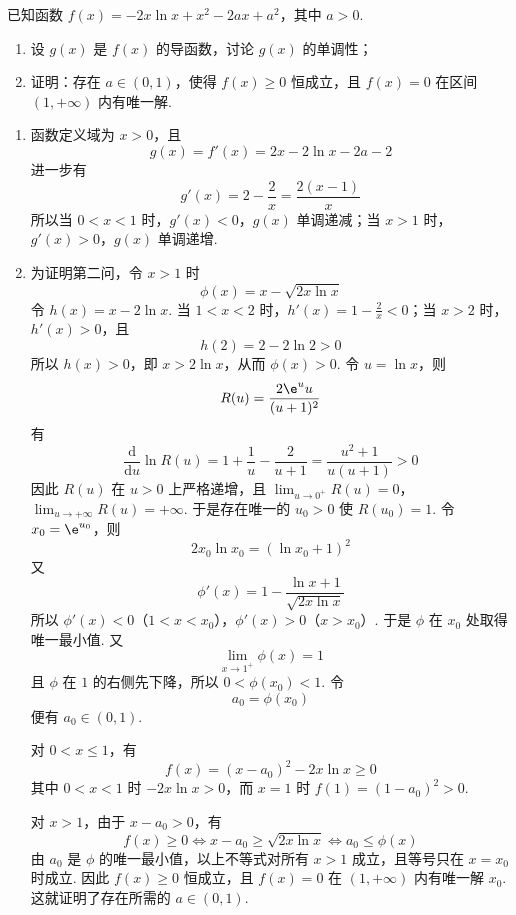 \begin{problem}
已知函数 \(f(x) = -2x\ln x + x^2 - 2ax + a^2\)，其中 \(a > 0\).

\begin{enumerate}
\item 设 \(g(x)\) 是 \(f(x)\) 的导函数，讨论 \(g(x)\) 的单调性；
\item 证明：存在 \(a \in (0,1)\)，使得 \(f(x) \geqslant 0\) 恒成立，且 \(f(x) = 0\) 在区间 \((1, +\infty)\) 内有唯一解.
\end{enumerate}
\end{problem}

\begin{solution}
\begin{enumerate}
\item
函数定义域为 \(x>0\)，且
\[
g(x)=f'(x)=2x-2\ln x-2a-2
\]
进一步有
\[
g'(x)=2-\frac2x=\frac{2(x-1)}x
\]
所以当 \(0<x<1\) 时，\(g'(x)<0\)，\(g(x)\) 单调递减；当 \(x>1\) 时，\(g'(x)>0\)，\(g(x)\) 单调递增.

\item
为证明第二问，令 \(x>1\) 时
\[
\phi(x)=x-\sqrt{2x\ln x}
\]
令 \(h(x)=x-2\ln x\). 当 \(1<x<2\) 时，\(h'(x)=1-\frac2x<0\)；当 \(x>2\) 时，\(h'(x)>0\)，且
\[
h(2)=2-2\ln2>0
\]
所以 \(h(x)>0\)，即 \(x>2\ln x\)，从而 \(\phi(x)>0\). 令 \(u=\ln x\)，则
\[
R(u)=\frac{2\e^u u}{(u+1)^2}
\]
有
\[
\frac{\mathrm d}{\mathrm du}\ln R(u)
=1+\frac1u-\frac2{u+1}
=\frac{u^2+1}{u(u+1)}>0
\]
因此 \(R(u)\) 在 \(u>0\) 上严格递增，且
\(\lim_{u\to0^+}R(u)=0\)，\(\lim_{u\to+\infty}R(u)=+\infty\).
于是存在唯一的 \(u_0>0\) 使 \(R(u_0)=1\). 令 \(x_0=\e^{u_0}\)，则
\[
2x_0\ln x_0=(\ln x_0+1)^2
\]
又
\[
\phi'(x)=1-\frac{\ln x+1}{\sqrt{2x\ln x}}
\]
所以 \(\phi'(x)<0\)（\(1<x<x_0\)），\(\phi'(x)>0\)（\(x>x_0\)）. 于是 \(\phi\) 在 \(x_0\) 处取得唯一最小值. 又
\[
\lim_{x\to1^+}\phi(x)=1
\]
且 \(\phi\) 在 \(1\) 的右侧先下降，所以 \(0<\phi(x_0)<1\). 令
\[
a_0=\phi(x_0)
\]
便有 \(a_0\in(0,1)\).

对 \(0<x\leqslant1\)，有
\[
f(x)=(x-a_0)^2-2x\ln x\geqslant0
\]
其中 \(0<x<1\) 时 \(-2x\ln x>0\)，而 \(x=1\) 时 \(f(1)=(1-a_0)^2>0\).

对 \(x>1\)，由于 \(x-a_0>0\)，有
\[
f(x)\geqslant0
\Longleftrightarrow
x-a_0\geqslant\sqrt{2x\ln x}
\Longleftrightarrow
a_0\leqslant\phi(x)
\]
由 \(a_0\) 是 \(\phi\) 的唯一最小值，以上不等式对所有 \(x>1\) 成立，且等号只在 \(x=x_0\) 时成立. 因此 \(f(x)\geqslant0\) 恒成立，且 \(f(x)=0\) 在 \((1,+\infty)\) 内有唯一解 \(x_0\). 这就证明了存在所需的 \(a\in(0,1)\).
\end{enumerate}
\end{solution}
